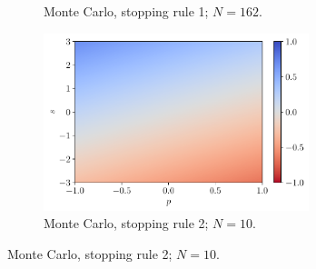 \documentclass[a4paper, 12pt]{article}
\begin{document}
\begin{figure}[H]
\begin{subfigure}{0.49\textwidth}
            \caption{Monte Carlo, stopping rule 1; $N = 162$.}
        \end{subfigure}
        \hfill
        \begin{subfigure}{0.49\textwidth}
            \centering
            \includegraphics[width=0.85\textwidth]{resources/pdf/4_montecarlo_2_LR_q_+4.pdf}
            \caption{Monte Carlo, stopping rule 2; $N = 10$.}
        \end{subfigure}
        \label{fig:qn.lr.plus.4}
    \end{figure}
    
\end{document}

